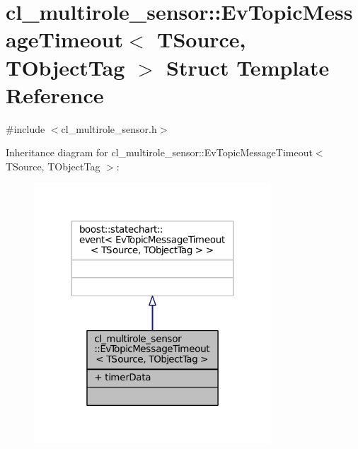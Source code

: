 \hypertarget{structcl__multirole__sensor_1_1EvTopicMessageTimeout}{}\section{cl\+\_\+multirole\+\_\+sensor\+:\+:Ev\+Topic\+Message\+Timeout$<$ T\+Source, T\+Object\+Tag $>$ Struct Template Reference}
\label{structcl__multirole__sensor_1_1EvTopicMessageTimeout}


{\ttfamily \#include $<$cl\+\_\+multirole\+\_\+sensor.\+h$>$}



Inheritance diagram for cl\+\_\+multirole\+\_\+sensor\+:\+:Ev\+Topic\+Message\+Timeout$<$ T\+Source, T\+Object\+Tag $>$\+:
\nopagebreak
\begin{figure}[H]
\begin{center}
\leavevmode
\includegraphics[width=251pt]{structcl__multirole__sensor_1_1EvTopicMessageTimeout__inherit__graph}
\end{center}
\end{figure}


